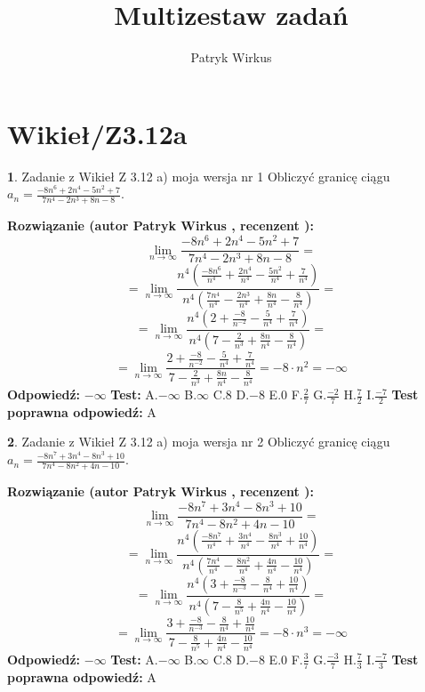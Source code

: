 \documentclass[12pt, a4paper]{article}
\title{Multizestaw zadań}
\author{Patryk Wirkus}
\date{}
\theoremstyle{definition} %
\newtheorem{zad}{}
\newcommand{\kategoria}[1]{\section{#1}}
\newcommand{\zadStart}[1]{\begin{zad}#1\newline}
\newcommand{\zadStop}{\end{zad}}
\newcommand{\rozwStart}[2]{\noindent \textbf{Rozwiązanie (autor #1 , recenzent #2): }\newline}
\newcommand{\rozwStop}{\newline}
\newcommand{\odpStart}{\noindent \textbf{Odpowiedź:}\newline}
\newcommand{\odpStop}{\newline}
\newcommand{\testStart}{\noindent \textbf{Test:}\newline}
\newcommand{\testStop}{\newline}
\newcommand{\kluczStart}{\noindent \textbf{Test poprawna odpowiedź:}\newline}
\newcommand{\kluczStop}{\newline}
\begin{document}
\maketitle

\kategoria{Wikieł/Z3.12a}


\zadStart{Zadanie z Wikieł Z 3.12 a) moja wersja nr 1}
Obliczyć granicę ciągu $a_{n}=\frac{-8n^{6}+2n^{4}-5n^{2}+7}{7n^{4}-2n^{3}+8n-8}$.
\zadStop
\rozwStart{Patryk Wirkus}{}
$$\lim\limits_{n\to\infty}\frac{-8n^{6}+2n^{4}-5n^{2}+7}{7n^{4}-2n^{3}+8n-8}=$$
$$=\lim\limits_{n\to\infty}\frac{n^{4}\left(\frac{-8n^{6}}{n^{4}}+\frac{2n^{4}}{n^{4}}-\frac{5n^{2}}{n^{4}}+\frac{7}{n^{4}}\right)}{n^{4}\left(\frac{7n^{4}}{n^{4}}-\frac{2n^{3}}{n^{4}}+\frac{8n}{n^{4}}-\frac{8}{n^{4}}\right)}=$$
$$=\lim\limits_{n\to\infty}\frac{n^{4}\left(2+\frac{-8}{n^{-2}}-\frac{5}{n^{4}}+\frac{7}{n^{4}}\right)}
{n^{4}\left(7-\frac{2}{n^{3}}+\frac{8n}{n^{4}}-\frac{8}{n^{4}}\right)}=$$
$$=\lim\limits_{n\to\infty}\frac{2+\frac{-8}{n^{-2}}-\frac{5}{n^{4}}+\frac{7}{n^{4}}}{7-\frac{2}{n^{3}}+\frac{8n}{n^{4}}-\frac{8}{n^{4}}}=-8\cdot n^{2} = -\infty$$
\rozwStop
\odpStart
$-\infty$
\odpStop
\testStart
A.$-\infty$
B.$\infty$
C.$8$
D.$-8$
E.$0$
F.$\frac{2}{7}$
G.$\frac{-2}{7}$
H.$\frac{7}{2}$
I.$\frac{-7}{2}$
\testStop
\kluczStart
A
\kluczStop



\zadStart{Zadanie z Wikieł Z 3.12 a) moja wersja nr 2}
Obliczyć granicę ciągu $a_{n}=\frac{-8n^{7}+3n^{4}-8n^{3}+10}{7n^{4}-8n^{2}+4n-10}$.
\zadStop
\rozwStart{Patryk Wirkus}{}
$$\lim\limits_{n\to\infty}\frac{-8n^{7}+3n^{4}-8n^{3}+10}{7n^{4}-8n^{2}+4n-10}=$$
$$=\lim\limits_{n\to\infty}\frac{n^{4}\left(\frac{-8n^{7}}{n^{4}}+\frac{3n^{4}}{n^{4}}-\frac{8n^{3}}{n^{4}}+\frac{10}{n^{4}}\right)}{n^{4}\left(\frac{7n^{4}}{n^{4}}-\frac{8n^{2}}{n^{4}}+\frac{4n}{n^{4}}-\frac{10}{n^{4}}\right)}=$$
$$=\lim\limits_{n\to\infty}\frac{n^{4}\left(3+\frac{-8}{n^{-3}}-\frac{8}{n^{4}}+\frac{10}{n^{4}}\right)}
{n^{4}\left(7-\frac{8}{n^{5}}+\frac{4n}{n^{4}}-\frac{10}{n^{4}}\right)}=$$
$$=\lim\limits_{n\to\infty}\frac{3+\frac{-8}{n^{-3}}-\frac{8}{n^{4}}+\frac{10}{n^{4}}}{7-\frac{8}{n^{5}}+\frac{4n}{n^{4}}-\frac{10}{n^{4}}}=-8\cdot n^{3} = -\infty$$
\rozwStop
\odpStart
$-\infty$
\odpStop
\testStart
A.$-\infty$
B.$\infty$
C.$8$
D.$-8$
E.$0$
F.$\frac{3}{7}$
G.$\frac{-3}{7}$
H.$\frac{7}{3}$
I.$\frac{-7}{3}$
\testStop
\kluczStart
A
\kluczStop
\end{document}
